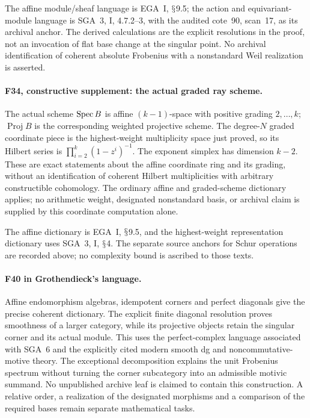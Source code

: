 \documentclass[11pt,a4paper]{article}
\renewcommand{\S}{\ensuremath{\mathsection}}
\newcommand{\fid}[1]{\textsf{#1}}\newcommand{\gate}[1]{\textsf{#1}}
\theoremstyle{named}\newtheorem{finding}{Finding}[section]
\theoremstyle{definition}\newtheorem{definition}[finding]{Definition}
\theoremstyle{remark}\newtheorem{remark}[finding]{Remark}
\begin{document}
The affine module/sheaf language is EGA~I, \S9.5; the action and
equivariant-module language is SGA~3, I, 4.7.2--3, with the audited
cote~90, scan~17, as its archival anchor. The derived calculations
are the explicit resolutions in the proof, not an invocation of
flat base change at the singular point. No archival identification
of coherent absolute Frobenius with a nonstandard Weil realization
is asserted.


\paragraph{\fid{F34}, constructive supplement: the actual graded ray scheme.}
The actual scheme $\operatorname{Spec} B$ is affine $(k-1)$-space with positive
grading $2,\ldots,k$; $\operatorname{Proj}B$ is the corresponding
weighted projective scheme. The degree-$N$ graded coordinate piece
is the highest-weight multiplicity space just proved, so its Hilbert
series is $\prod_{i=2}^k(1-z^i)^{-1}$. The exponent simplex has
dimension $k-2$. These are exact statements about the affine
coordinate ring and its grading, without an identification of
coherent Hilbert multiplicities with arbitrary constructible
cohomology. The ordinary affine and graded-scheme dictionary applies;
no arithmetic weight, designated nonstandard basis, or archival
claim is supplied by this coordinate computation alone.

The affine dictionary is EGA~I, \S9.5, and the highest-weight representation dictionary uses SGA~3, I, \S4. The separate source anchors for Schur operations are recorded above; no complexity bound is ascribed to those texts.


\paragraph{\fid{F40} in Grothendieck's language.}
Affine endomorphism algebras, idempotent corners and perfect
diagonals give the precise coherent dictionary. The explicit
finite diagonal resolution proves smoothness of a larger category,
while its projective objects retain the singular corner and its
actual module. This uses the perfect-complex language associated
with SGA~6 and the explicitly cited modern smooth dg and
noncommutative-motive theory. The exceptional decomposition
explains the unit Frobenius spectrum without turning the corner
subcategory into an admissible motivic summand. No unpublished
archive leaf is claimed to contain this construction. A relative
order, a realization of the designated morphisms and a comparison
of the required bases remain separate mathematical tasks.
\end{document}

